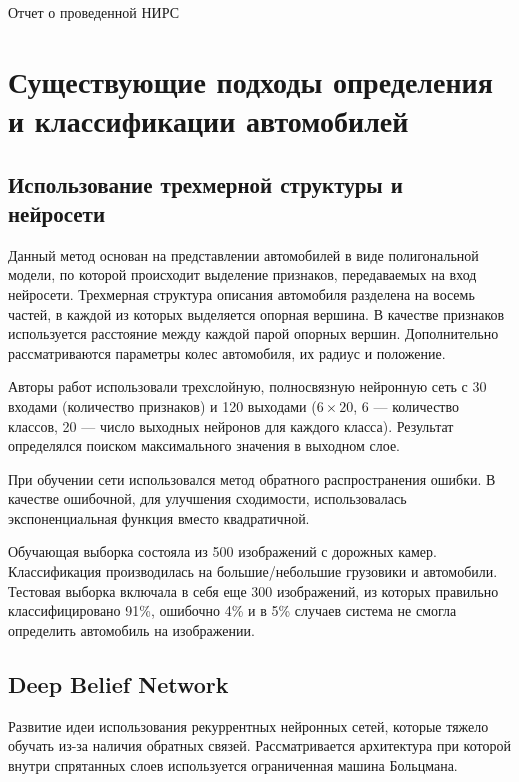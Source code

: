 \documentclass[a4paper,14pt]{extarticle} %
\begin{document}
 
\renewcommand{\figurename}{Рисунок}
\renewcommand{\baselinestretch}{1.5}
\renewcommand{\abstractname}{{Аннотация}}

\begin{center}
\huge Отчет о проведенной НИРС
\end{center}
\renewcommand{\contentsname}{\centering Разделы}
\tableofcontents
\newpage

\section{Существующие подходы определения и классификации автомобилей}
\subsection[Использование трехмерной структуры и нейросети]{Использование трехмерной структуры и нейросети~\cite{wu2001method}} \label{3Dstruct}
\hspace{\parindent} Данный метод основан на представлении автомобилей в виде полигональной модели, по которой происходит выделение признаков, передаваемых на вход нейросети. Трехмерная структура описания автомобиля разделена на восемь частей, в каждой из которых выделяется опорная вершина. В качестве признаков используется расстояние между каждой парой опорных вершин. Дополнительно рассматриваются параметры колес автомобиля, их радиус и положение.

Авторы работ использовали трехслойную, полносвязную нейронную сеть с 30 входами (количество признаков) и 120 выходами ($6 \times 20$, 6 --- количество классов, 20 --- число выходных нейронов для каждого класса). Результат определялся поиском максимального значения в выходном слое. 

При обучении сети использовался метод обратного распространения ошибки. В качестве ошибочной, для улучшения сходимости, использовалась экспоненциальная функция вместо квадратичной. 

Обучающая выборка состояла из 500 изображений с дорожных камер. Классификация производилась на большие/небольшие грузовики и автомобили. Тестовая выборка включала в себя еще 300 изображений, из которых правильно классифицировано 91\%, ошибочно 4\% и в 5\% случаев система не смогла определить автомобиль на изображении.

\subsection[Deep Belief Network]{Deep Belief Network~\cite{wang2014vehicle}}
\hspace{\parindent} Развитие идеи использования рекуррентных нейронных сетей, которые тяжело обучать из-за наличия обратных связей. Рассматривается архитектура при которой внутри спрятанных слоев используется ограниченная машина Больцмана. 
\end{document}
